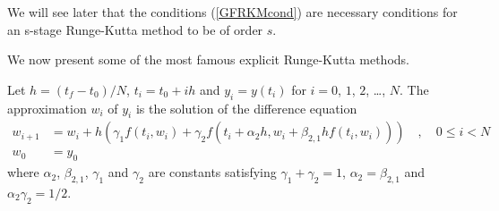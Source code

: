 \begin{rmk}
We will see later that the conditions (\ref{GFRKMcond}) are necessary
conditions for an s-stage Runge-Kutta method to be of order $s$.
\end{rmk}

We now present some of the most famous explicit Runge-Kutta methods.

\begin{defn}
Let $h=(t_f-t_0)/N$, $t_i=t_0+ih$ and $y_i = y(t_i)$ for $i=0$,
$1$, $2$, \ldots, $N$.  The approximation $w_i$ of $y_i$ is the solution of
the difference equation
\begin{align*}
w_{i+1} & = w_i + h\left(\gamma_1 f(t_i,w_i) + \gamma_2
f(t_i+\alpha_2 h,w_i+ \beta_{2,1} hf(t_i,w_i))\right)
\quad, \quad 0 \leq i < N \\
w_0 & = y_0
\end{align*}
where $\alpha_2$, $\beta_{2,1}$, $\gamma_1$ and $\gamma_2$ are
constants satisfying $\gamma_1 + \gamma_2 = 1$, $\alpha_2 = \beta_{2,1}$
and $\alpha_2 \gamma_2 = 1/2$.
\label{RK2}
\end{defn}

